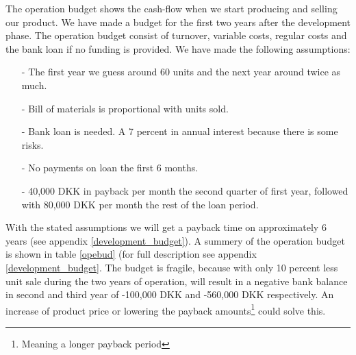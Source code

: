 The operation budget shows the cash-flow when we start producing and selling our product. We have made a budget for the first two years after the development phase. The operation budget consist of turnover, variable costs, regular costs and the bank loan if no funding is provided. We have made the following assumptions:
\begin{itemize}
\item[-] The first year we guess around 60 units and the next year around twice as much.
\item[-] Bill of materials is proportional with units sold.
\item[-] Bank loan is needed. A 7 percent in annual interest because there is some risks.
\item[-] No payments on loan the first 6 months.
\item[-] 40,000 DKK in payback per month the second quarter of first year, followed with 80,000 DKK per month the rest of the loan period.
\end{itemize}
With the stated assumptions we will get a payback time on approximately 6 years (see appendix \ref{development_budget}).
A summery of the operation budget is shown in table \ref{opebud} (for full description see appendix \ref{development_budget}.
The budget is fragile, because with only 10 percent less unit sale during the two years of operation, will result in a negative bank balance in second and third year of -100,000 DKK and -560,000 DKK respectively. An increase of product price or lowering the payback amounts\footnote{Meaning a longer payback period} could solve this.  

